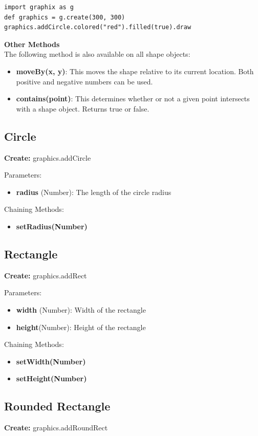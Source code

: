 \documentclass{article}
\begin{document}
\begin{lstlisting}
import graphix as g
def graphics = g.create(300, 300)
graphics.addCircle.colored("red").filled(true).draw
\end{lstlisting}

\textbf{Other Methods}\\
The following method is also available on all shape objects:
\begin{itemize}
\item \textbf{moveBy(x, y)}: This moves the shape relative to its current location. Both positive
and negative numbers can be used.
\item \textbf{contains(point)}: This determines whether or not a given point intersects with a shape
object. Returns true or false.
\end{itemize}

\subsection{Circle}
\textbf{Create:} graphics.addCircle

Parameters:
\begin{itemize}
\item \textbf{radius} (Number): The length of the circle radius
\end{itemize}

Chaining Methods:
\begin{itemize}
\item \textbf{setRadius(Number)}
\end{itemize}

\subsection{Rectangle}
\textbf{Create:} graphics.addRect

Parameters:
\begin{itemize}
\item \textbf{width} (Number): Width of the rectangle
\item \textbf{height}(Number): Height of the rectangle
\end{itemize}

Chaining Methods:
\begin{itemize}
\item \textbf{setWidth(Number)} 
\item \textbf{setHeight(Number)}
\end{itemize}

\subsection{Rounded Rectangle}
\textbf{Create:} graphics.addRoundRect
\end{document}
